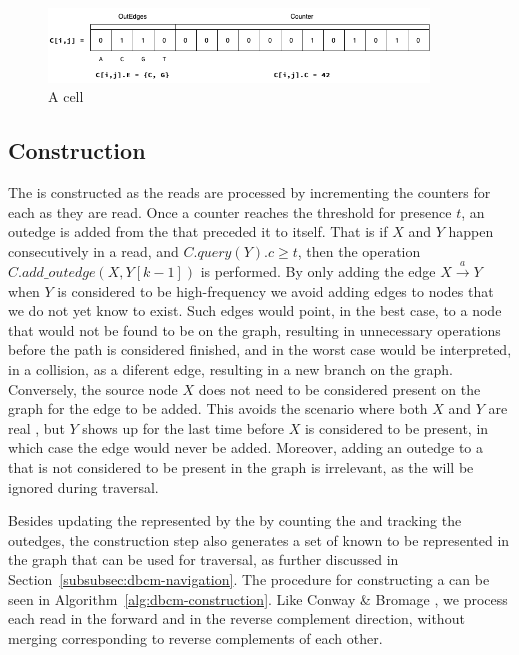 \begin{figure}[htbp]
  \centering
  \includegraphics[width=0.9\textwidth]{figures/dbcm-bit_use}
  \caption{A \dBCM cell}\label{fig:dbcm-bit_use}
\end{figure}

\subsection{\dBCM Construction}
\label{subsubsec:dbcm-construction}

The \dBCM is constructed as the reads are processed by incrementing the counters for each \kmer as they are read. Once a  counter reaches the threshold for presence $t$, an outedge is added from the \kmer that preceded it to itself. That is if  $X$ and $Y$ happen consecutively in a read, and $C.\mathit{query}(Y).c \geq t$, then the operation $C.\mathit{add\_outedge}(X, Y[k-1])$ is performed. 
%
By only adding the edge $X\stackrel{a}{\longrightarrow}Y$ when $Y$ is considered to be high-frequency we avoid adding edges to nodes that we do not yet know to exist. Such edges would point, in the best case, to a node that would not be found to be on the graph, resulting in unnecessary operations before the path is considered finished, and in the worst case would be interpreted, in a collision, as a diferent edge, resulting in a new branch on the graph. Conversely, the source node $X$ does not need to be considered present on the graph for the edge to be added. This avoids the scenario where both $X$ and $Y$ are real , but $Y$ shows up for the last time before $X$ is considered to be present, in which case the edge would never be added. Moreover, adding an outedge to a \kmer that is not considered to be present in the graph is irrelevant, as the \kmer will be ignored during traversal. 

Besides updating the \dBG represented by the \dBCM by counting the  and tracking the outedges, the construction step also generates a set of  known to be represented in the graph that can be used for traversal, as further discussed in Section~\ref{subsubsec:dbcm-navigation}. The procedure for constructing a \dBCM can be seen in Algorithm~\ref{alg:dbcm-construction}. Like Conway \& Bromage \cite{Conway2011}, we process each read in the forward and in the reverse complement direction, without merging  corresponding to reverse complements of each other.

